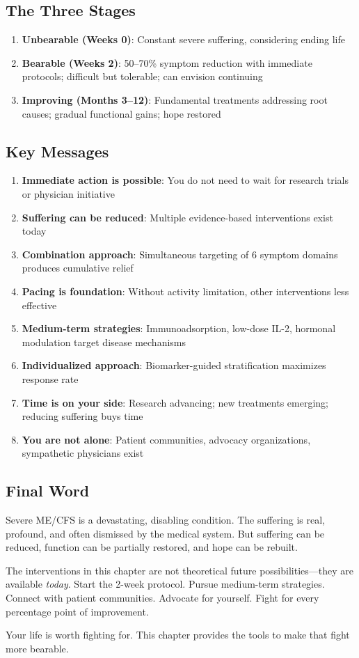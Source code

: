 \subsection{The Three Stages}

\begin{enumerate}
    \item \textbf{Unbearable (Weeks 0)}: Constant severe suffering, considering ending life
    \item \textbf{Bearable (Weeks 2)}: 50--70\% symptom reduction with immediate protocols; difficult but tolerable; can envision continuing
    \item \textbf{Improving (Months 3--12)}: Fundamental treatments addressing root causes; gradual functional gains; hope restored
\end{enumerate}

\subsection{Key Messages}

\begin{enumerate}
    \item \textbf{Immediate action is possible}: You do not need to wait for research trials or physician initiative
    \item \textbf{Suffering can be reduced}: Multiple evidence-based interventions exist today
    \item \textbf{Combination approach}: Simultaneous targeting of 6 symptom domains produces cumulative relief
    \item \textbf{Pacing is foundation}: Without activity limitation, other interventions less effective
    \item \textbf{Medium-term strategies}: Immunoadsorption, low-dose IL-2, hormonal modulation target disease mechanisms
    \item \textbf{Individualized approach}: Biomarker-guided stratification maximizes response rate
    \item \textbf{Time is on your side}: Research advancing; new treatments emerging; reducing suffering buys time
    \item \textbf{You are not alone}: Patient communities, advocacy organizations, sympathetic physicians exist
\end{enumerate}

\subsection{Final Word}

Severe ME/CFS is a devastating, disabling condition. The suffering is real, profound, and often dismissed by the medical system. But suffering can be reduced, function can be partially restored, and hope can be rebuilt.

The interventions in this chapter are not theoretical future possibilities—they are available \emph{today}. Start the 2-week protocol. Pursue medium-term strategies. Connect with patient communities. Advocate for yourself. Fight for every percentage point of improvement.

Your life is worth fighting for. This chapter provides the tools to make that fight more bearable.

